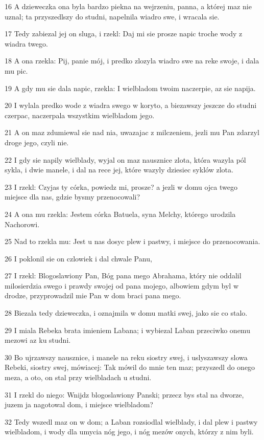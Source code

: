 \par 16 A dzieweczka ona byla bardzo piekna na wejrzeniu, panna, a której maz nie uznal; ta przyszedlszy do studni, napelnila wiadro swe, i wracala sie.
\par 17 Tedy zabiezal jej on sluga, i rzekl: Daj mi sie prosze napic troche wody z wiadra twego.
\par 18 A ona rzekla: Pij, panie mój, i predko zlozyla wiadro swe na reke swoje, i dala mu pic.
\par 19 A gdy mu sie dala napic, rzekla: I wielbladom twoim naczerpie, az sie napija.
\par 20 I wylala predko wode z wiadra swego w koryto, a biezawszy jeszcze do studni czerpac, naczerpala wszystkim wielbladom jego.
\par 21 A on maz zdumiewal sie nad nia, uwazajac z milczeniem, jezli mu Pan zdarzyl droge jego, czyli nie.
\par 22 I gdy sie napily wielblady, wyjal on maz nausznice zlota, która wazyla pól sykla, i dwie manele, i dal na rece jej, które wazyly dziesiec syklów zlota.
\par 23 I rzekl: Czyjas ty córka, powiedz mi, prosze? a jezli w domu ojca twego miejsce dla nas, gdzie bysmy przenocowali?
\par 24 A ona mu rzekla: Jestem córka Batuela, syna Melchy, którego urodzila Nachorowi.
\par 25 Nad to rzekla mu: Jest u nas dosyc plew i pastwy, i miejsce do przenocowania.
\par 26 I poklonil sie on czlowiek i dal chwale Panu,
\par 27 I rzekl: Blogoslawiony Pan, Bóg pana mego Abrahama, który nie oddalil milosierdzia swego i prawdy swojej od pana mojego, albowiem gdym byl w drodze, przyprowadzil mie Pan w dom braci pana mego.
\par 28 Biezala tedy dzieweczka, i oznajmila w domu matki swej, jako sie co stalo.
\par 29 I miala Rebeka brata imieniem Labana; i wybiezal Laban przeciwko onemu mezowi az ku studni.
\par 30 Bo ujrzawszy nausznice, i manele na reku siostry swej, i uslyszawszy slowa Rebeki, siostry swej, mówiacej: Tak mówil do mnie ten maz; przyszedl do onego meza, a oto, on stal przy wielbladach u studni.
\par 31 I rzekl do niego: Wnijdz blogoslawiony Panski; przecz bys stal na dworze, juzem ja nagotowal dom, i miejsce wielbladom?
\par 32 Tedy wszedl maz on w dom; a Laban rozsiodlal wielblady, i dal plew i pastwy wielbladom, i wody dla umycia nóg jego, i nóg mezów onych, którzy z nim byli.
